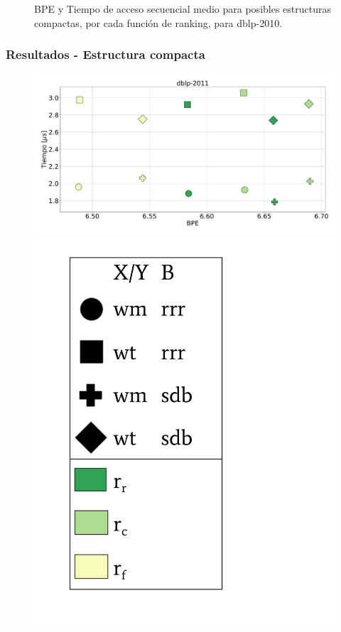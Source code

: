 \begin{frame}
\begin{figure}
	\caption{BPE y Tiempo de acceso secuencial medio para posibles estructuras compactas, por cada función de ranking, para dblp-2010.}
\end{figure}

\end{frame}

\begin{frame}
\frametitle{Resultados - Estructura compacta}

\begin{figure}
	\centering
	
    	\begin{minipage}{1\textwidth}
    		\centering
    		\begin{minipage}{0.8\textwidth}
    			\centering
    			\includegraphics[width=1\linewidth]{../img/sdsl/secuencialBig/dblp-2011.pdf}
    		\end{minipage}
    		\begin{minipage}{0.15\textwidth}
    			\centering
    			\includegraphics[scale=.15, clip, trim=70 0 0 0]{../img/sdsl/label.pdf}

\end{minipage}
\end{minipage}
\end{figure}
\end{frame}
